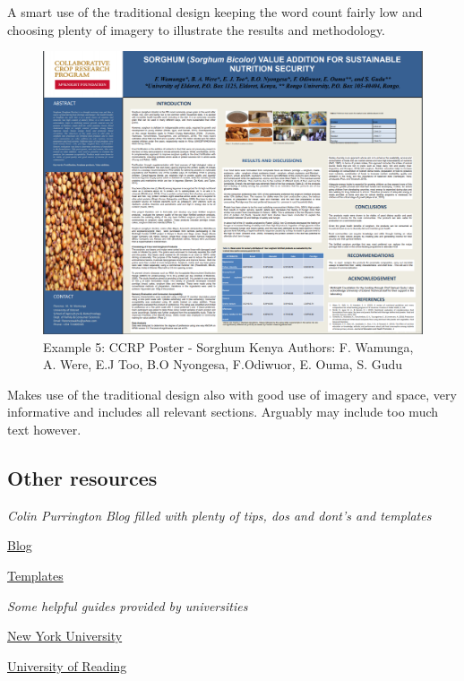 \documentclass[
]{book}
\begin{document}
A smart use of the traditional design keeping the word count fairly low and choosing plenty of imagery to illustrate the results and methodology.

\begin{figure}
\centering
\includegraphics{img/Sorghum Kenya.png}
\caption{Example 5: CCRP Poster - Sorghum Kenya Authors: F. Wamunga, A. Were, E.J Too, B.O Nyongesa, F.Odiwuor, E. Ouma, S. Gudu}
\end{figure}

Makes use of the traditional design also with good use of imagery and space, very informative and includes all relevant sections. Arguably may include too much text however.

\hypertarget{other-resources-1}{%
\subsection{Other resources}\label{other-resources-1}}

\emph{Colin Purrington Blog filled with plenty of tips, dos and dont's and templates}

\href{https://colinpurrington.com/tips/poster-design/}{Blog}

\href{https://colinpurrington.com/2019/06/templates-for-better-posters/}{Templates}

\emph{Some helpful guides provided by universities}

\href{https://guides.nyu.edu/posters}{New York University}

\href{https://www.reading.ac.uk/web/files/dps/Conference_poster_PPT_examples.pdf}{University of Reading}
\end{document}
